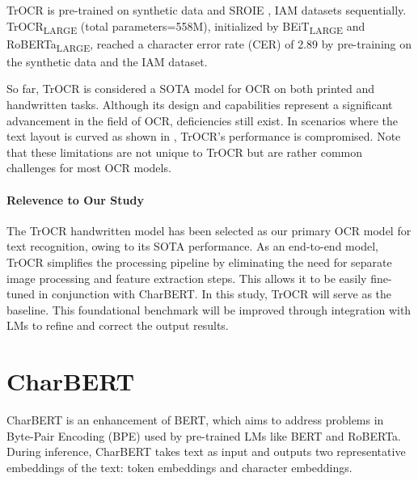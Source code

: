 TrOCR is pre-trained on synthetic data and SROIE \citep{huang2019icdar2019}, IAM datasets \citep{marti1999full} sequentially. TrOCR\textsubscript{LARGE} (total parameters=558M), initialized by BEiT\textsubscript{LARGE} and RoBERTa\textsubscript{LARGE}, reached a character error rate (CER) \citep{klakow2002testing}\citep{wang2003word} of 2.89 by pre-training on the synthetic data and the IAM dataset.

So far, TrOCR is considered a SOTA model for OCR on both printed and handwritten tasks. Although its design and capabilities represent a significant advancement in the field of OCR, deficiencies still exist. In scenarios where the text layout is curved as shown in , TrOCR's performance is compromised. Note that these limitations are not unique to TrOCR but are rather common challenges for most OCR models.

\paragraph*{Relevence to Our Study}
The TrOCR handwritten model has been selected as our primary OCR model for text recognition, owing to its SOTA performance. As an end-to-end model, TrOCR simplifies the processing pipeline by eliminating the need for separate image processing and feature extraction steps. This allows it to be easily fine-tuned in conjunction with CharBERT. In this study, TrOCR will serve as the baseline. This foundational benchmark will be improved through integration with LMs to refine and correct the output results.


\section{CharBERT}
\label{sec:2_charbert}
CharBERT \citep{ma-etal-2020-charbert} is an enhancement of BERT, which aims to address problems in Byte-Pair Encoding (BPE) \citep{sennrich2015neural} used by pre-trained LMs like BERT and RoBERTa. During inference, CharBERT takes text as input and outputs two representative embeddings of the text: token embeddings and character embeddings.

